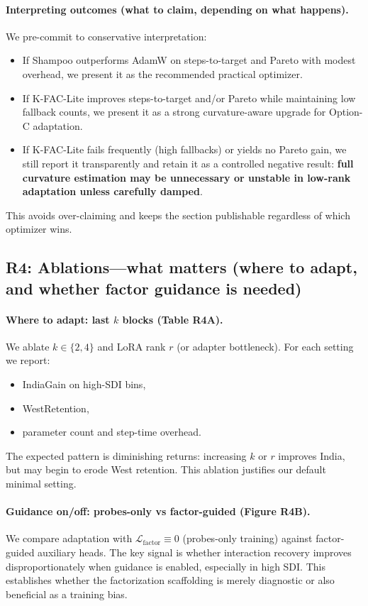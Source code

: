 \vspace{4pt}
\paragraph{Interpreting outcomes (what to claim, depending on what happens).}
We pre-commit to conservative interpretation:
\begin{itemize}[leftmargin=*,itemsep=2pt]
\item If Shampoo outperforms AdamW on steps-to-target and Pareto with modest overhead, we present it as the recommended practical optimizer.
\item If K-FAC-Lite improves steps-to-target and/or Pareto while maintaining low fallback counts, we present it as a strong curvature-aware upgrade for Option-C adaptation.
\item If K-FAC-Lite fails frequently (high fallbacks) or yields no Pareto gain, we still report it transparently and retain it as a controlled negative result: \textbf{full curvature estimation may be unnecessary or unstable in low-rank adaptation unless carefully damped}.
\end{itemize}
This avoids over-claiming and keeps the section publishable regardless of which optimizer wins.

\subsection{R4: Ablations---what matters (where to adapt, and whether factor guidance is needed)}
\label{sec:r4_ablations}

\paragraph{Where to adapt: last $k$ blocks (Table R4A).}
We ablate $k\in\{2,4\}$ and LoRA rank $r$ (or adapter bottleneck). For each setting we report:
\begin{itemize}[leftmargin=*,itemsep=2pt]
\item IndiaGain on high-SDI bins,
\item WestRetention,
\item parameter count and step-time overhead.
\end{itemize}
The expected pattern is diminishing returns: increasing $k$ or $r$ improves India, but may begin to erode West retention. This ablation justifies our default minimal setting.

\vspace{4pt}
\paragraph{Guidance on/off: probes-only vs factor-guided (Figure R4B).}
We compare adaptation with $\mathcal{L}_{\text{factor}} \equiv 0$ (probes-only training) against factor-guided auxiliary heads. The key signal is whether interaction recovery improves disproportionately when guidance is enabled, especially in high SDI. This establishes whether the factorization scaffolding is merely diagnostic or also beneficial as a training bias.

